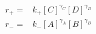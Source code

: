 \begin{eqnarray}
r_+  = & k_+[C]^{\gamma_C}[D]^{\gamma_D} \\
r_-  = & k_-[A]^{\gamma_A}[B]^{\gamma_B} \\
\end{eqnarray}